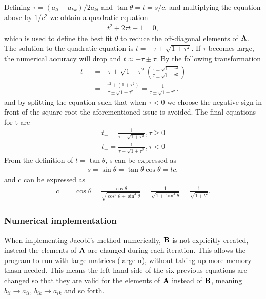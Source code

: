 \documentclass{emulateapj}
\begin{document}
%
Defining $\tau = \left(a_{ll} - a_{kk}\right)/2a_{kl}$ and $\tan\theta = t = s/c$, and multiplying the equation above by $1/c^2$ we obtain a quadratic equation 
%
\begin{gather*}
    t^2 + 2\tau t - 1 = 0,
\end{gather*}
%
which is used to define the best fit $\theta$ to reduce the off-diagonal elements of $\bold{A}$. The solution to the quadratic equation is $t = -\tau \pm \sqrt{1 + \tau^2}$. If $\tau$ becomes large, the numerical accuracy will drop and $t \approx -\tau \pm \tau$. By the following transformation
%
\begin{align*}
    t_{\pm} &= -\tau \pm \sqrt{1+\tau^2}\left(\frac{\tau \pm \sqrt{1+\tau^2}}{\tau \pm \sqrt{1+\tau^2}}\right) \\
    &= \frac{-\tau^2 + \left(1 + \tau^2\right)}{\tau \pm \sqrt{1 + \tau^2}} = \frac{1}{\tau \pm \sqrt{1+\tau^2}}.
\end{align*}
%
and by splitting the equation such that when $\tau < 0$ we choose the negative sign in front of the square root the aforementioned issue is avoided. The final equations for t are
%
\begin{align*}
    t_+ = \frac{1}{\tau + \sqrt{1 + \tau^2}}, \tau \geq 0 \\
    t_- = \frac{1}{\tau - \sqrt{1 + \tau^2}}, \tau < 0
\end{align*}
%
From the definition of $t = \tan\theta$, s can be expressed as
%
\begin{align*}
    s = \sin\theta = \tan\theta \cos\theta = tc,
\end{align*}
and c can be expressed as
\begin{align*}
    c &= \cos\theta = \frac{\cos\theta}{\sqrt{\cos^2\theta + \sin^2\theta}} = \frac{1}{\sqrt{1 + \tan^2\theta}}  = \frac{1}{\sqrt{1 + t^2}}.
\end{align*}


 
\subsubsection{Numerical implementation}
When implementing Jacobi's method numerically, $\bold{B}$ is not explicitly created, instead the elements of $\bold{A}$ are changed during each iteration. This allows the program to run with large matrices (large n), without taking up more memory thasn needed. This means the left hand side of the six previous equations are changed so that they are valid for the elements of $\bold{A}$ instead of $\bold{B}$, meaning $b_{ii} \rightarrow a_{ii}$, $b_{ik} \rightarrow a_{ik}$ and so forth.
\end{document}
